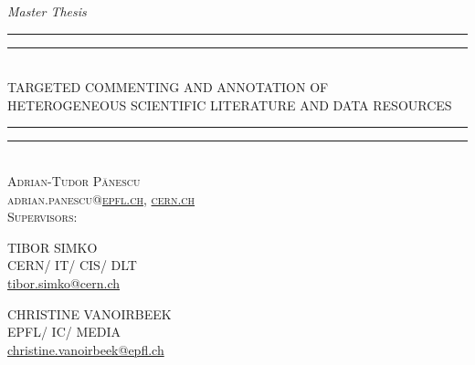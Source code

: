 
\begin{titlepage}
  \centering
  \vspace*{5\baselineskip}
  \textit{Master Thesis}
  \\\vspace*{\baselineskip}
  \rule{\textwidth}{1.6pt}\vspace*{-\baselineskip}\vspace*{2pt}
  \rule{\textwidth}{0.4pt}\\[\baselineskip]
  {TARGETED COMMENTING AND ANNOTATION OF\\[0.3\baselineskip] HETEROGENEOUS SCIENTIFIC LITERATURE AND DATA RESOURCES}
  \rule{\textwidth}{0.4pt}\vspace*{-\baselineskip}\vspace{3.2pt}
  \rule{\textwidth}{1.6pt}\\[\baselineskip]
  \scshape
  \vspace*{2\baselineskip}
  Adrian-Tudor P\u{a}nescu\\
  adrian.panescu@\href{mailto:adrian.panescu@epfl.ch}{epfl.ch},
                 \href{mailto:adrian.panescu@cern.ch}{cern.ch}
  \\\vspace*{4\baselineskip}
  Supervisors:
  \\\vspace*{1\baselineskip}
  \begin{minipage}{0.4\textwidth}
    \centering
    TIBOR SIMKO\\
    CERN/ IT/ CIS/ DLT\\
    \href{mailto:tibor.simko@cern.ch}{tibor.simko@cern.ch}
  \end{minipage}
  \begin{minipage}{0.4\textwidth}
    \centering
    CHRISTINE VANOIRBEEK\\
    EPFL/ IC/ MEDIA\\
    \href{mailto:christine.vanoirbeek@epfl.ch}{christine.vanoirbeek@epfl.ch}
  \end{minipage}
  \vfill
  \begin{minipage}{0.4\textwidth}
    \centering

\end{minipage}
\end{titlepage}
